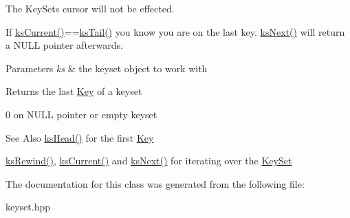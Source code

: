 The Key\-Sets cursor will not be effected.

If \hyperlink{group__keyset_ga4287b9416912c5f2ab9c195cb74fb094}{ks\-Current()}==\hyperlink{group__keyset_gadca442c4ab43cf532b15091d7711559e}{ks\-Tail()} you know you are on the last key. \hyperlink{group__keyset_ga317321c9065b5a4b3e33fe1c399bcec9}{ks\-Next()} will return a N\-U\-L\-L pointer afterwards.


\begin{DoxyParams}{Parameters}
{\em ks} & the keyset object to work with \\
\hline
\end{DoxyParams}
\begin{DoxyReturn}{Returns}
the last \hyperlink{classkdb_1_1Key}{Key} of a keyset 

0 on N\-U\-L\-L pointer or empty keyset 
\end{DoxyReturn}
\begin{DoxySeeAlso}{See Also}
\hyperlink{group__keyset_gae7dbf3aef70e67b5328475eb3d1f92f5}{ks\-Head()} for the first \hyperlink{group__key}{Key} 

\hyperlink{group__keyset_gabe793ff51f1728e3429c84a8a9086b70}{ks\-Rewind()}, \hyperlink{group__keyset_ga4287b9416912c5f2ab9c195cb74fb094}{ks\-Current()} and \hyperlink{group__keyset_ga317321c9065b5a4b3e33fe1c399bcec9}{ks\-Next()} for iterating over the \hyperlink{group__keyset}{Key\-Set} 
\end{DoxySeeAlso}
 

The documentation for this class was generated from the following file\-:\begin{DoxyCompactItemize}
\item 
keyset.\-hpp\end{DoxyCompactItemize}

